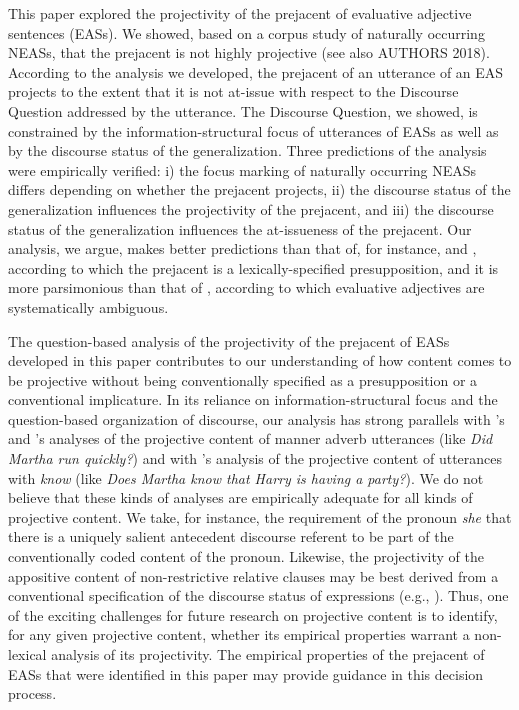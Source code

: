 \documentclass[11pt,fleqn]{article}
\newcommand{\6}{\mbox{$[\hspace*{-.6mm}[$}}
\newcommand{\9}{\mbox{$]\hspace*{-.6mm}]$}}
\newcommand{\citepos}[1]{\citeauthor{#1}'s \citeyear{#1}}
\begin{document}
This paper explored the projectivity of the prejacent of evaluative adjective sentences (EASs). We showed, based on a corpus study of naturally occurring NEASs, that the prejacent is not highly projective (see also AUTHORS 2018). According to the analysis we developed, the prejacent of an utterance of an EAS projects to the extent that it is not at-issue with respect to the Discourse Question addressed by the utterance. The Discourse Question, we showed, is constrained by the information-structural focus of utterances of EASs as well as by the discourse status of the generalization. Three predictions of the analysis were empirically verified: i) the focus marking of naturally occurring NEASs differs depending on whether the prejacent projects, ii) the discourse status of the generalization influences the projectivity of the prejacent, and iii) the discourse status of the generalization influences the at-issueness of the prejacent. Our analysis, we argue, makes better predictions than that of, for instance, \citet{barker02} and \citet{oshima09b}, according to which the prejacent is a lexically-specified presupposition, and it is more parsimonious than that of \citet{karttunen-etal2014}, according to which evaluative adjectives are systematically ambiguous.

The question-based analysis of the projectivity of the prejacent of EASs developed in this paper contributes to our understanding of how content comes to be projective without being conventionally specified as a presupposition or a conventional implicature. In its reliance on information-structural focus and the question-based organization of discourse, our analysis has strong parallels with \citepos{abrusan2013} and \citepos{stevens-etal2017} analyses of the projective content of manner adverb utterances (like {\em Did Martha run quickly?}) and with \citepos{best-question} analysis of the projective content of utterances with {\em know} (like {\em Does Martha know that Harry is having a party?}). We do not believe that these kinds of analyses are empirically adequate for all kinds of projective content. We take, for instance, the requirement of the pronoun {\em she} that there is a uniquely salient antecedent discourse referent to be part of the conventionally coded content of the pronoun. Likewise, the projectivity of the appositive content of non-restrictive relative clauses may be best derived from a conventional specification of the discourse status of expressions (e.g., \citealt{potts05,murray2014}). Thus, one of the exciting challenges for future research on projective content is to identify, for any given projective content, whether its empirical properties warrant a non-lexical analysis of its projectivity. The empirical properties of the prejacent of EASs that were identified in this paper may provide guidance in this decision process.
\end{document}
